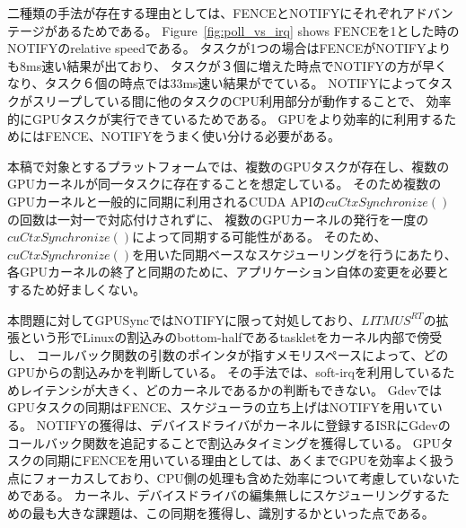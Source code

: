 二種類の手法が存在する理由としては、FENCEとNOTIFYにそれぞれアドバンテージがあるためである。
Figure~\ref{fig:poll_vs_irq} shows FENCEを1とした時のNOTIFYのrelative speedである。
タスクが1つの場合はFENCEがNOTIFYよりも8ms速い結果が出ており、
タスクが３個に増えた時点でNOTIFYの方が早くなり、タスク６個の時点では33ms速い結果がでている。
NOTIFYによってタスクがスリープしている間に他のタスクのCPU利用部分が動作することで、
効率的にGPUタスクが実行できているためである。
GPUをより効率的に利用するためにはFENCE、NOTIFYをうまく使い分ける必要がある。

本稿で対象とするプラットフォームでは、複数のGPUタスクが存在し、複数のGPUカーネルが同一タスクに存在することを想定している。
そのため複数のGPUカーネルと一般的に同期に利用されるCUDA APIの$cuCtxSynchronize()$の回数は一対一で対応付けされずに、
複数のGPUカーネルの発行を一度の$cuCtxSynchronize()$によって同期する可能性がある。
そのため、$cuCtxSynchronize()$を用いた同期ベースなスケジューリングを行うにあたり、各GPUカーネルの終了と同期のために、アプリケーション自体の変更を必要とするため好ましくない。

本問題に対してGPUSyncではNOTIFYに限って対処しており、$LITMUS^{RT}$の拡張という形でLinuxの割込みのbottom-halfであるtaskletをカーネル内部で傍受し、
コールバック関数の引数のポインタが指すメモリスペースによって、どのGPUからの割込みかを判断している。
その手法では、soft-irqを利用しているためレイテンシが大きく、どのカーネルであるかの判断もできない。
GdevではGPUタスクの同期はFENCE、スケジューラの立ち上げはNOTIFYを用いている。
NOTIFYの獲得は、デバイスドライバがカーネルに登録するISRにGdevのコールバック関数を追記することで割込みタイミングを獲得している。
GPUタスクの同期にFENCEを用いている理由としては、あくまでGPUを効率よく扱う点にフォーカスしており、CPU側の処理も含めた効率について考慮していないためである。
カーネル、デバイスドライバの編集無しにスケジューリングするための最も大きな課題は、この同期を獲得し、識別するかといった点である。
